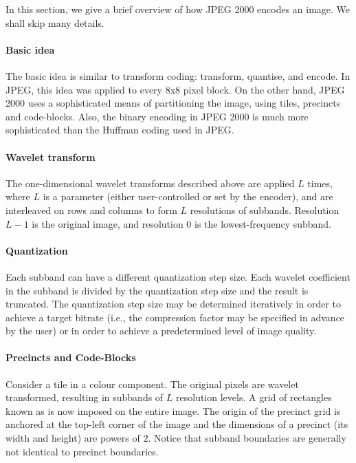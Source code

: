 \documentclass[a4paper, 11pt, openany]{book}
\begin{document}
In this section, we give a brief overview of how JPEG 2000 encodes an image. We shall skip many details.

\paragraph{Basic idea}
The basic idea is similar to transform coding: transform, quantise, and encode. In JPEG, this idea was applied to every 8x8 pixel block. On the other hand, JPEG 2000 uses a sophisticated means of partitioning the image, using tiles, precincts and code-blocks. Also, the binary encoding in JPEG 2000 is much more sophisticated than the Huffman coding used in JPEG.

\paragraph{Wavelet transform}
The one-dimensional wavelet transforms described above are applied $L$ times, where $L$ is a parameter (either user-controlled or set by the encoder), and are interleaved on rows and columns to form $L$ resolutions of subbands. Resolution $L - 1$ is the original image, and resolution $0$ is the lowest-frequency subband.

\paragraph{Quantization}
Each subband can have a different quantization step size. Each
wavelet coefficient in the subband is divided by the quantization step size and the result is truncated. The quantization step size may be determined iteratively in order to achieve a target bitrate (i.e., the compression factor may be specified in advance by the user) or in order to achieve a predetermined level of image quality.

\paragraph{Precincts and Code-Blocks}

Consider a tile in a colour component. The original pixels are wavelet transformed, resulting in subbands of $L$ resolution levels. A grid of rectangles known as  is now imposed on the entire image. The origin of the precinct grid is anchored at the top-left corner of the image and the dimensions of a precinct (its width and height) are powers of $2$. Notice that subband boundaries are generally not identical to precinct boundaries.
\end{document}
